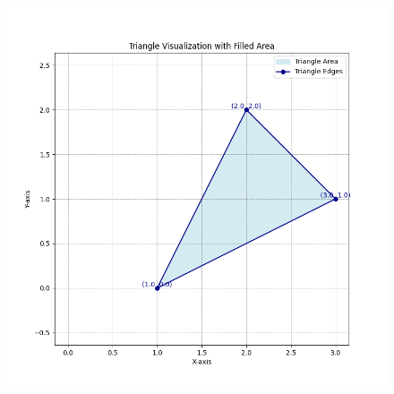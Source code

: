 \documentclass[journal]{IEEEtran}
\begin{document}
\begin{figure}[h!]
   \centering
   \includegraphics[width=\columnwidth]{figure/fig.png}
\end{figure}




 

 
\end{document}
